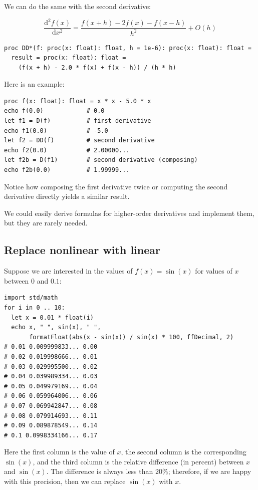 \documentclass[justified, sixbynine]{tufte-book}
\def\ft{\small\tt}
\theoremstyle{plain}%
\newtheorem * {corollary}{Corollary}
\theoremstyle{definition}
\theoremstyle{remark}
\newtheorem * {remark}{Remark}
\newtheorem * {note}{Note}
\begin{document}
\begin{fullwidth}
We can do the same with the second derivative:

\begin{equation}
  \frac{\textrm{d}^2f(x)}{\textrm{d}x^2} = \frac{f(x+h)-2f(x)-f(x-h)}{h^2} + O(h)
\end{equation}

\begin{lstlisting}[caption={in file: {\ft nlib.nim}}]
proc DD*(f: proc(x: float): float, h = 1e-6): proc(x: float): float =
  result = proc(x: float): float =
    (f(x + h) - 2.0 * f(x) + f(x - h)) / (h * h)
\end{lstlisting}

Here is an example:

\begin{lstlisting}
proc f(x: float): float = x * x - 5.0 * x
echo f(0.0)            # 0.0
let f1 = D(f)          # first derivative
echo f1(0.0)           # -5.0
let f2 = DD(f)         # second derivative
echo f2(0.0)           # 2.00000...
let f2b = D(f1)        # second derivative (composing)
echo f2b(0.0)          # 1.99999...
\end{lstlisting}

Notice how composing the first derivative twice or computing the second derivative directly yields a similar result.

We could easily derive formulas for higher-order derivatives and implement them, but they are rarely needed.

\goodbreak\subsection{Replace nonlinear with linear}


Suppose we are interested in the values of $f(x)=\sin(x)$ for values of $x$ between $0$ and $0.1$:

\begin{lstlisting}
import std/math
for i in 0 .. 10:
  let x = 0.01 * float(i)
  echo x, " ", sin(x), " ",
       formatFloat(abs(x - sin(x)) / sin(x) * 100, ffDecimal, 2)
# 0.01 0.009999833... 0.00
# 0.02 0.019998666... 0.01
# 0.03 0.029995500... 0.02
# 0.04 0.039989334... 0.03
# 0.05 0.049979169... 0.04
# 0.06 0.059964006... 0.06
# 0.07 0.069942847... 0.08
# 0.08 0.079914693... 0.11
# 0.09 0.089878549... 0.14
# 0.1 0.0998334166... 0.17
\end{lstlisting}
Here the first column is the value of $x$, the second column is the corresponding $\sin(x)$, and the third column is the relative difference (in percent) between $x$ and $\sin(x)$. The difference is always less than $20\%$; therefore, if we are happy with this precision, then we can replace $\sin(x)$ with $x$.


\end{fullwidth}
\end{document}
